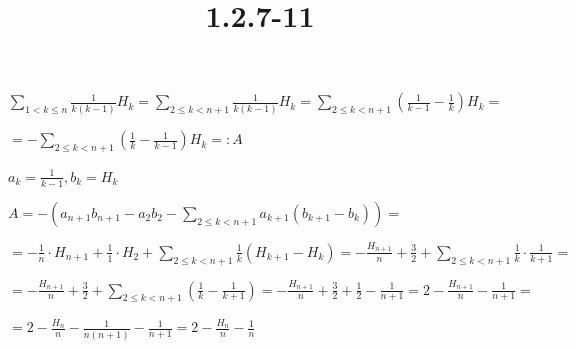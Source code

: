\documentclass{article}
\title{1.2.7-11}
\begin{document}
\maketitle

\( \sum_{1<k\leq n} \frac{1}{k(k-1)}H_k = \sum_{2 \leq k < n + 1} \frac{1}{k(k-1)}H_k = \sum_{2 \leq k < n + 1} (\frac{1}{k-1} - \frac{1}{k}) H_k = \)

\( = - \sum_{2 \leq k < n + 1} (\frac{1}{k} - \frac{1}{k-1}) H_k =: A \)

\( a_k = \frac{1}{k-1}, b_k = H_k \)

\( A = -(a_{n+1}b_{n+1} - a_2b_2 - \sum_{2\leq k < n + 1} a_{k+1}(b_{k+1}-b_k)) = \)

\( = -\frac{1}{n} \cdot H_{n+1} + \frac{1}{1} \cdot H_2 + \sum_{2\leq k < n + 1} \frac{1}{k}(H_{k+1}-H_k) = -\frac{H_{n+1}}{n} + \frac{3}{2} + \sum_{2\leq k < n+1}\frac{1}{k} \cdot \frac{1}{k+1} = \)

\( = -\frac{H_{n+1}}{n} + \frac{3}{2} + \sum_{2\leq k < n+1}(\frac{1}{k} - \frac{1}{k+1}) = -\frac{H_{n+1}}{n} + \frac{3}{2} + \frac{1}{2} - \frac{1}{n+1} = 2 - \frac{H_{n+1}}{n} - \frac{1}{n+1} = \)

\( = 2 - \frac{H_n}{n} - \frac{1}{n(n+1)} - \frac{1}{n+1} = 2 - \frac{H_n}{n} - \frac{1}{n} \)
\end{document}

